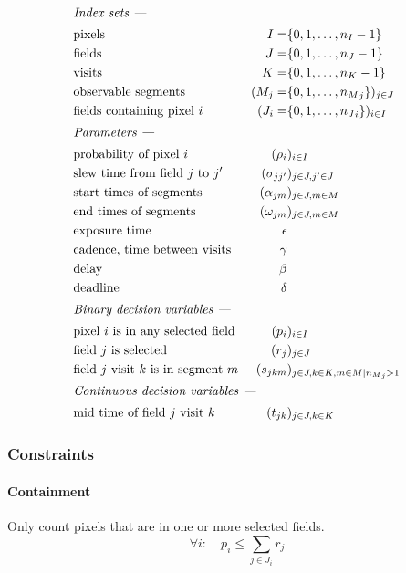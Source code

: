 \documentclass[twocolumn,times]{aastex631}
\begin{document}
\begin{alignat*}{4}
\intertext{\it Index sets ---}
    &\text{pixels}&
        I =& \{0, 1, \dots, n_I - 1\} \\
    &\text{fields}&
        J =& \{0, 1, \dots, n_J - 1\} \\
    &\text{visits}&
        K =& \{0, 1, \dots, n_K - 1\} \\
    &\text{observable segments}&
        (M_j =& \{0, 1, \dots, {n_M}_j\})_{j \in J} \\
    &\text{fields containing pixel $i$}&
        (J_i =& \{0, 1, \dots, {n_J}_i\})_{i \in I} \\
\intertext{\it Parameters ---}
    &\text{probability of pixel $i$}&
        (\rho_i&)_{i \in I} \\
    &\text{slew time from field $j$ to $j^\prime$}&
        (\sigma_{jj^\prime}&)_{j \in J, j^\prime \in J} \\
    &\text{start times of segments}&
        (\alpha_{jm}&)_{j \in J, m \in M} \\
    &\text{end times of segments}&
        (\omega_{jm}&)_{j \in J, m \in M} \\
    &\text{exposure time}&
        \epsilon& \\
    &\text{cadence, time between visits}&
        \gamma& \\
    &\text{delay}&
        \beta& \\
    &\text{deadline}&
        \delta& \\
\intertext{\it Binary decision variables ---}
    &\text{pixel $i$ is in any selected field}&
        (p_i&)_{i \in I} \\
    &\text{field $j$ is selected}&
        (r_j&)_{j \in J} \\
    &\text{field $j$ visit $k$ is in segment $m$}&
        (s_{jkm}&)_{j \in J, k \in K, m \in M \mid {n_M}_j > 1} \\
\intertext{\it Continuous decision variables ---}
    &\text{mid time of field $j$ visit $k$}& (t_{jk}&)_{j \in J, k \in K}
\end{alignat*}

\subsubsection{Constraints}

\paragraph{Containment}
Only count pixels that are in one or more selected fields.
%
\begin{equation}
    \label{eq:fixed-exptime-constraint-containment}
    \forall i :\quad p_i \leq \sum_{j \in J_i} r_j
\end{equation}
\end{document}
